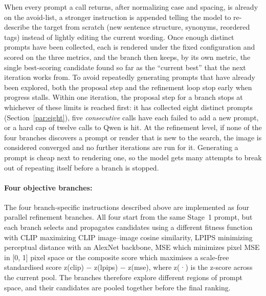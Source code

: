 \documentclass[runningheads]{llncs}
\begin{document}
When every prompt a call returns, after normalizing case and spacing, is already on the avoid-list, a stronger instruction is appended telling the model to re-describe the target from scratch (new sentence structure, synonyms, reordered tags) instead of lightly editing the current wording. Once enough distinct prompts have been collected, each is rendered under the fixed configuration and scored on the three metrics, and the branch then keeps, by its own metric, the single best-scoring candidate found so far as the ``current best'' that the next iteration works from. To avoid repeatedly generating prompts that have already been explored, both the proposal step and the refinement loop stop early when progress stalls. Within one iteration, the proposal step for a branch stops at whichever of these limits is reached first: it has collected eight distinct prompts (Section~\ref{par:eight}), five \emph{consecutive} calls have each failed to add a new prompt, or a hard cap of twelve calls to Qwen is hit. At the refinement level, if none of the four branches discovers a prompt or render that is new to the search, the image is considered converged and no further iterations are run for it. Generating a prompt is cheap next to rendering one, so the model gets many attempts to break out of repeating itself before a branch is stopped.                                                       

\paragraph{\normalfont\textbf{Four objective branches:}} 

The four branch-specific instructions described above are implemented as four parallel refinement branches. All four start from the same Stage~1 prompt, but each branch selects and propagates candidates using a different fitness function with CLIP maximizing CLIP image–image cosine similarity, LPIPS minimizing perceptual distance with an AlexNet backbone, MSE which minimizes pixel MSE in [0, 1] pixel space or the composite score which maximises a scale-free standardised score z(clip) $-$ z(lpips) $-$ z(mse), where z(·) is the z-score across the current pool. The branches therefore explore different regions of prompt space, and their candidates are pooled together before the final ranking.
\end{document}
